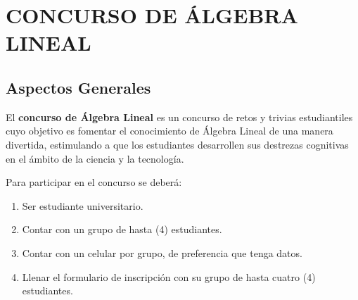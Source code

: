 \documentclass[compacto,10pt]{pubciencias-notas}
\begin{document}
\encabezado

\vspace*{-4mm}

\setcounter{section}{3}
\section{CONCURSO DE ÁLGEBRA LINEAL}
\setcounter{subsection}{5}
\subsection{Aspectos Generales}

El \textbf{concurso de Álgebra Lineal} es un concurso de retos y trivias estudiantiles cuyo objetivo es fomentar el conocimiento de Álgebra Lineal de una manera divertida, estimulando a que los estudiantes desarrollen sus destrezas cognitivas en el ámbito de la ciencia y la tecnología.


Para participar en el concurso se deberá:
\begin{enumerate}

\item 
Ser estudiante universitario.
\item 
Contar con un grupo de hasta (4) estudiantes.
\item 
Contar con un celular por grupo, de preferencia que tenga datos.
\item 
Llenar el formulario de inscripción con su grupo de hasta cuatro (4) estudiantes. 

\end{enumerate}
\end{document}
